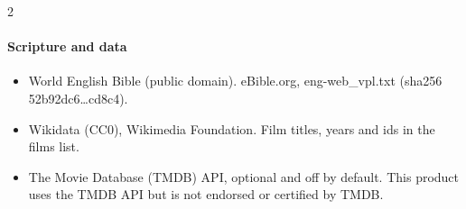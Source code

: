\documentclass[10pt]{article}
\theoremstyle{definition}
\theoremstyle{remark}
\begin{document}
\begin{multicols}{2}
\paragraph{Scripture and data}
\begin{itemize}[leftmargin=1em,itemsep=0pt,topsep=1pt,parsep=0pt]
\item World English Bible (public domain). eBible.org, eng-web\_vpl.txt (sha256 52b92dc6\ldots{}cd8c4).
\item Wikidata (CC0), Wikimedia Foundation. Film titles, years and ids in the films list.
\item The Movie Database (TMDB) API, optional and off by default. This product uses the TMDB API but is not endorsed or certified by TMDB.
\end{itemize}
\end{multicols}
\normalsize
\renewcommand{\refname}{Works cited}
\end{document}
